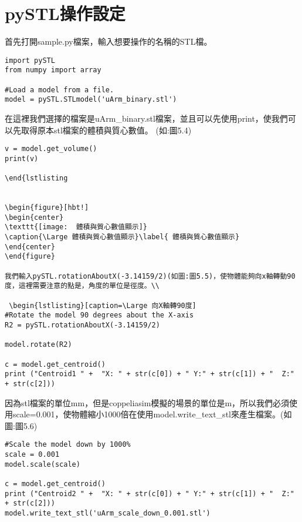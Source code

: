 \section{ pySTL操作設定}
首先打開sample.py檔案，輸入想要操作的名稱的STL檔。\\

 \begin{lstlisting}[caption=\Large 輸入名稱]
import pySTL
from numpy import array

#Load a model from a file.
model = pySTL.STLmodel('uArm_binary.stl')

\end{lstlisting}

在這裡我們選擇的檔案是uArm_binary.stl檔案，並且可以先使用print，使我們可以先取得原本stl檔案的體積與質心數值。 (如:圖5.4)\\

 \begin{lstlisting}[caption=\Large 數值]
v = model.get_volume()
print(v)

\end{lstlisting


\begin{figure}[hbt!]
\begin{center}
\texttt{[image:  體積與質心數值顯示]}
\caption{\Large 體積與質心數值顯示}\label{ 體積與質心數值顯示}
\end{center}
\end{figure}

我們輸入pySTL.rotationAboutX(-3.14159/2)(如圖:圖5.5)，使物體能夠向x軸轉動90度，這裡需要注意的點是，角度的單位是徑度。\\

 \begin{lstlisting}[caption=\Large 向X軸轉90度]
#Rotate the model 90 degrees about the X-axis
R2 = pySTL.rotationAboutX(-3.14159/2)

model.rotate(R2)

c = model.get_centroid()
print ("Centroid1 " +  "X: " + str(c[0]) + " Y:" + str(c[1]) + "  Z:" + str(c[2]))

\end{lstlisting}

因為stl檔案的單位mm，但是coppeliasim模擬的場景的單位是m，所以我們必須使用scale=0.001，使物體縮小1000倍在使用model.write_text_stl來產生檔案。(如圖:圖5.6)\\

 \begin{lstlisting}[caption=\Large 縮小1000倍]
#Scale the model down by 1000%
scale = 0.001
model.scale(scale)

c = model.get_centroid()
print ("Centroid2 " +  "X: " + str(c[0]) + " Y:" + str(c[1]) + "  Z:" + str(c[2]))
model.write_text_stl('uArm_scale_down_0.001.stl')

\end{lstlisting}

